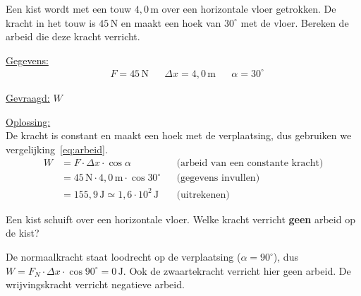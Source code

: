 \documentclass{ximera}
\begin{document}
\begin{example}[foldable=true,title={Voorbeeld: een kist voorttrekken}]\nl
    Een kist wordt met een touw $4{,}0 \, \mathrm{m}$ over een horizontale vloer getrokken. De kracht in het touw is $45 \, \mathrm{N}$ en maakt een hoek van $30^\circ$ met de vloer. Bereken de arbeid die deze kracht verricht.

    \begin{solution}\nl
        \underline{Gegevens:}
        \begin{align*}
            & F = 45 \, \mathrm{N} & & \Delta x = 4{,}0 \, \mathrm{m} & & \alpha = 30^\circ
        \end{align*}

        \underline{Gevraagd:} $W$

        \underline{Oplossing:}\\
        De kracht is constant en maakt een hoek met de verplaatsing, dus gebruiken we vergelijking~\ref{eq:arbeid}.
        \begin{align*}
            W &= F \cdot \Delta x \cdot \cos \alpha && \text{(arbeid van een constante kracht)}\\
            &= 45 \, \mathrm{N} \cdot 4{,}0 \, \mathrm{m} \cdot \cos 30^\circ && \text{(gegevens invullen)}\\
            &= 155{,}9 \, \mathrm{J} \simeq \boxed{1{,}6 \cdot 10^{2} \, \mathrm{J}} && \text{(uitrekenen)}
        \end{align*}
    \end{solution}
\end{example}

\begin{question}
    Een kist schuift over een horizontale vloer. Welke kracht verricht \textbf{geen} arbeid op de kist?

    \begin{multipleChoice}
    \end{multipleChoice}

    \begin{solution}\nl
        De normaalkracht staat loodrecht op de verplaatsing ($\alpha = 90^\circ$), dus $W = F_N \cdot \Delta x \cdot \cos 90^\circ = 0 \, \mathrm{J}$. Ook de zwaartekracht verricht hier geen arbeid. De wrijvingskracht verricht negatieve arbeid.
    \end{solution}
\end{question}
\end{document}
